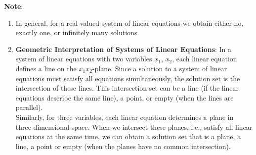 \vspace{0.5cm}
\textbf{Note}:
\begin{enumerate}[itemsep=0.2cm]
    \item In general, for a real-valued system of linear equations we obtain either no, exactly one, or infinitely many solutions. 
    \hfill \cite{mfml/book/mml/Deisenroth-Faisal-Ong}

    \item \textbf{Geometric Interpretation of Systems of Linear Equations}: 
    In a system of linear equations with two variables $x_1$, $x_2$, each linear equation defines a line on the $x_1x_2$-plane. Since a solution to a system of linear equations must satisfy all equations simultaneously, the solution set is the intersection of these lines. This intersection set can be a line (if the linear equations describe the same line), a point, or empty (when the lines are parallel).
    \hfill \cite{mfml/book/mml/Deisenroth-Faisal-Ong}
    \\
    Similarly, for three variables, each linear equation determines a plane in three-dimensional space. When we intersect these planes, i.e., satisfy all linear equations at the same time, we can obtain a solution set that is a plane, a line, a point or empty (when the planes have no common intersection).
    \hfill \cite{mfml/book/mml/Deisenroth-Faisal-Ong}

    
\end{enumerate}










